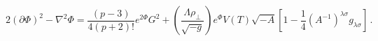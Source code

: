 \begin{equation}
2(\partial\Phi)^2 - \nabla^2\Phi = {\frac{(p-3)}{4(p+2)!}}
e^{2\Phi}G^2 + \left( {\frac{\Lambda\rho_\perp}{\sqrt{-g}}}
\right) e^{\Phi}V(T)\sqrt{-A} \left[ 1-{\frac{1}{4}}
(A^{-1})^{\lambda\sigma}g_{\lambda\sigma} \right] \, .
\end{equation}

